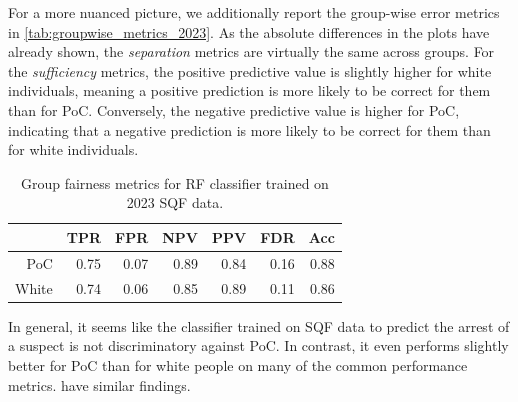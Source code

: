 For a more nuanced picture, we additionally report the group-wise error metrics in \autoref{tab:groupwise_metrics_2023}.
As the absolute differences in the plots have already shown, the \textit{separation} metrics are virtually the same across groups. For the \textit{sufficiency} metrics, the positive predictive value is slightly higher for white individuals, meaning a positive prediction is more likely to be correct for them than for PoC. Conversely, the negative predictive value is higher for PoC, indicating that a negative prediction is more likely to be correct for them than for white individuals.

\begin{table}[htbp]
    \centering
    \begin{tabular}{|rrrrrrr|}
      \hline
     & TPR & FPR & NPV & PPV & FDR & Acc \\ 
      \hline
      PoC & 0.75 & 0.07 & 0.89 & 0.84 & 0.16 & 0.88 \\ 
      White & 0.74 & 0.06 & 0.85 & 0.89 & 0.11 & 0.86 \\ 
       \hline
    \end{tabular}
    \caption{Group fairness metrics for RF classifier trained on 2023 SQF data.} 
    \label{tab:groupwise_metrics_2023}
\end{table}

In general, it seems like the classifier trained on SQF data to predict the arrest of a suspect is not discriminatory against PoC. In contrast, it even performs slightly better for PoC than for white people on many of the common performance metrics. \cite{Badr2022DTFANSP} have similar findings.\par

